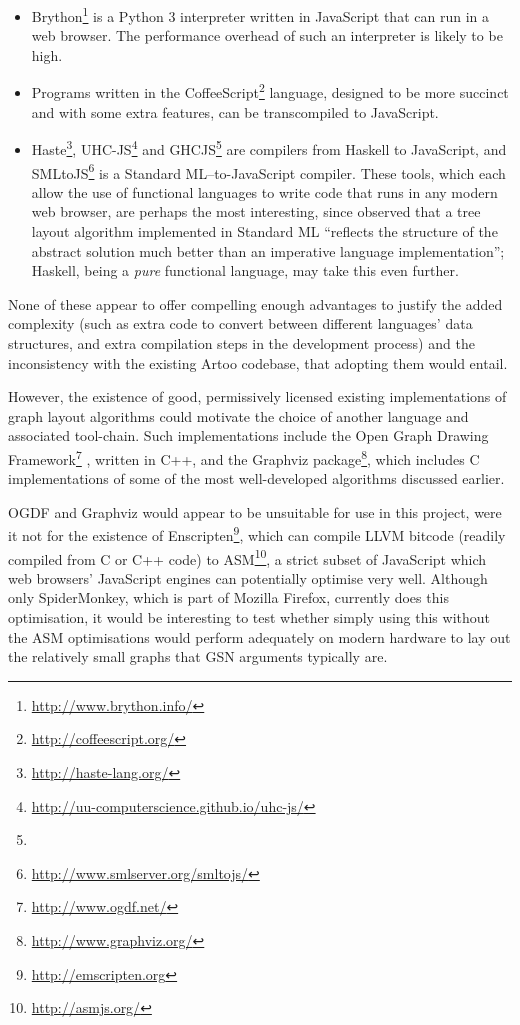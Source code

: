 \begin{itemize}

\item Brython\footnote{\url{http://www.brython.info/}} is a Python 3 interpreter written in JavaScript that can run in a web browser. The performance overhead of such an interpreter is likely to be high.

\item Programs written in the CoffeeScript\footnote{\url{http://coffeescript.org/}} language, designed to be more succinct and with some extra features, can be transcompiled to JavaScript.

\item Haste\footnote{\url{http://haste-lang.org/}}, UHC-JS\footnote{\url{http://uu-computerscience.github.io/uhc-js/}}
and GHCJS\footnote{} are compilers from Haskell to JavaScript, and
SMLtoJS\footnote{\url{http://www.smlserver.org/smltojs/}} is a Standard ML--to-JavaScript compiler.
These tools, which each allow the use of functional languages to write code that runs in any modern web browser, are perhaps the most interesting, since \citet{kennedyfuntrees} observed that a tree layout algorithm implemented in Standard ML ``reflects the structure of the abstract solution much better than an imperative language implementation''; Haskell, being a \emph{pure} functional language, may take this even further.

\end{itemize}

None of these appear to offer compelling enough advantages to justify the added complexity (such as extra code to convert between different languages' data structures, and extra compilation steps in the development process) and the inconsistency with the existing Artoo codebase, that adopting them would entail. 

However, the existence of good, permissively licensed existing implementations of graph layout algorithms could motivate the choice of another language and associated tool-chain.
Such implementations include
the Open Graph Drawing Framework\footnote{\url{http://www.ogdf.net/}} \cite{handbook},
written in C++,
and the Graphviz package\footnote{\url{http://www.graphviz.org/}},
which includes C implementations of some of the most well-developed algorithms \cite{gansner1993, gansner1998} discussed earlier.

OGDF and Graphviz would appear to be unsuitable for use in this project, were it not for the existence of Enscripten\footnote{\url{http://emscripten.org}}, which can compile LLVM bitcode (readily compiled from C or C++ code) to ASM\footnote{\url{http://asmjs.org/}}, a strict subset of JavaScript which web browsers' JavaScript engines can potentially optimise very well. Although only SpiderMonkey, which is part of Mozilla Firefox, currently does this optimisation, it would be interesting to test whether simply using this without the ASM optimisations would perform adequately on modern hardware to lay out the relatively small graphs that GSN arguments typically are.

